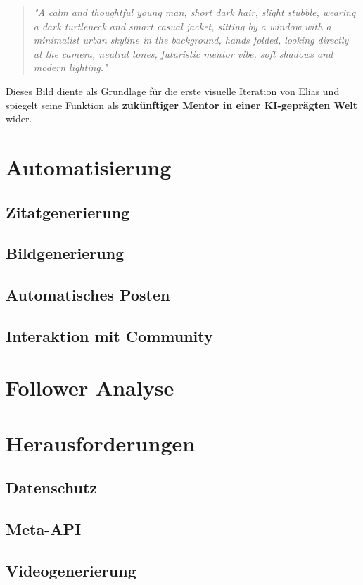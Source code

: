 \documentclass[a4paper,12pt]{article}
\begin{document}
\begin{quote}
\textit{"A calm and thoughtful young man, short dark hair, slight stubble, wearing a dark turtleneck and smart casual jacket, sitting by a window with a minimalist urban skyline in the background, hands folded, looking directly at the camera, neutral tones, futuristic mentor vibe, soft shadows and modern lighting."}
\end{quote}

Dieses Bild diente als Grundlage für die erste visuelle Iteration von Elias und spiegelt seine Funktion als \textbf{zukünftiger Mentor in einer KI-geprägten Welt} wider.


\section{Automatisierung}
\subsection{Zitatgenerierung}
\subsection{Bildgenerierung}
\subsection{Automatisches Posten}
\subsection{Interaktion mit Community}

\section{Follower Analyse}

\section{Herausforderungen}
\subsection{Datenschutz}
\subsection{Meta-API}
\subsection{Videogenerierung}
\end{document}
